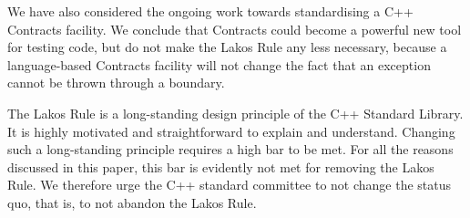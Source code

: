 We have also considered the ongoing work towards standardising a C++ Contracts facility. We conclude that Contracts could become a powerful new tool for testing code, but do not make the Lakos Rule any less necessary, because a language-based Contracts facility will not change the fact that an exception cannot be thrown through a  boundary.

The Lakos Rule is a long-standing design principle of the C++ Standard Library. It is highly motivated and straightforward to explain and understand. Changing such a long-standing principle requires a high bar to be met. For all the reasons discussed in this paper, this bar is evidently not met for removing the Lakos Rule. We therefore urge the C++ standard committee to not change the status quo, that is, to not abandon the Lakos Rule.





\renewcommand{\bibname}{References}





